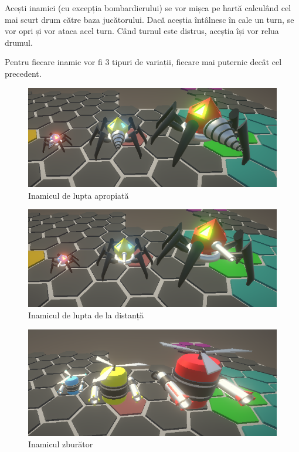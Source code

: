 \documentclass[12pt, a4paper]{article}
\begin{document}
	Acești inamici (cu excepția bombardierului) se vor mișca pe hartă calculând cel mai scurt drum către baza jucătorului. Dacă aceștia întâlnesc în cale un turn, se vor opri și vor ataca acel turn. Când turnul este distrus, aceștia își vor relua drumul.
	\newline
	
	Pentru fiecare inamic vor fi 3 tipuri de variații, fiecare mai puternic decât cel precedent.
	
	\begin{figure}[H]
		\centering
		\includegraphics[width=1\textwidth]{Melee.png}
		\caption{Inamicul de lupta apropiată}
		\label{fig: enemyMelee}
	\end{figure}

	\begin{figure}[H]
		\centering
		\includegraphics[width=1\textwidth]{Ranged.png}
		\caption{Inamicul de lupta de la distanță}
		\label{fig: enemyRanged}
	\end{figure}
	
	\begin{figure}[H]
		\centering
		\includegraphics[width=1\textwidth]{Flying.png}
		\caption{Inamicul zburător}
		\label{fig: enemyFlying}
	\end{figure}
	
\end{document}
